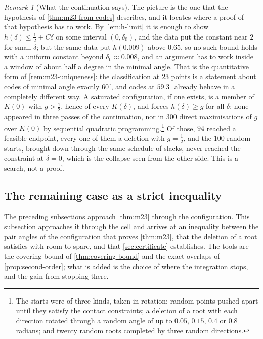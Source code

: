 \documentclass[11pt,reqno]{amsart}
\renewcommand{\_}{\origunderscore\allowbreak}
\numberwithin{equation}{section}
\theoremstyle{plain}
\theoremstyle{definition}
\theoremstyle{remark}
\newtheorem{remark}[thm]{Remark}
\begin{document}
\begin{remark}[What the continuation says]\label{rem:slack-continuation}
The picture is the one that the hypothesis of \cref{thm:m23-from-codes}
describes, and it locates where a proof of that hypothesis has to work. By \cref{lem:h-limit} it
is enough to show $h(\delta)\le\tfrac12+C\delta$ on some interval
$(0,\delta_0)$, and the data put the constant near $2$ for small
$\delta$; but the same data put $h(0.009)$ above $0.65$, so no such bound
holds with a uniform constant beyond $\delta_0\approx0.008$, and an
argument has to work inside a window of about half a degree in the
minimal angle. That is the quantitative form of
\cref{rem:m23-uniqueness}: the classification at $23$ points is a
statement about codes of minimal angle exactly $60^\circ$, and codes at
$59.3^\circ$ already behave in a completely different way. A saturated
configuration, if one exists, is a member of $K(0)$ with $g>\tfrac12$,
hence of every $K(\delta)$, and forces $h(\delta)\ge g$ for all $\delta$; none appeared
in three passes of the continuation, nor in $300$ direct maximisations
of $g$ over $K(0)$ by sequential quadratic programming.\footnote{The
starts were of three kinds, taken in rotation: random points pushed
apart until they satisfy the contact constraints; a deletion of a root
with each direction rotated through a random angle of up to $0.05$,
$0.15$, $0.4$ or $0.8$ radians; and twenty random roots completed by
three random directions.} Of those, $94$ reached a feasible endpoint,
every one of them a deletion with $g=\tfrac12$, and the $100$ random
starts, brought down through the same schedule of slacks, never reached
the constraint at $\delta=0$, which is the collapse seen from the other
side. This is a search, not a proof.
\end{remark}

\enlargethispage{\baselineskip}
\subsection{The remaining case as a strict inequality}\label{sec:strict-inequality}

The preceding subsections approach \cref{thm:m23} through the
configuration. This subsection approaches it through the cell and arrives
at an inequality between the pair angles of the configuration that proves
\cref{thm:m23}, that the deletion of a root satisfies with room to spare,
and that \cref{sec:certificate} establishes. The tools are the covering
bound of \cref{thm:covering-bound} and the exact overlaps of
\cref{prop:second-order}; what is added is the choice of where the
integration stops, and the gain from stopping there.
\end{document}
